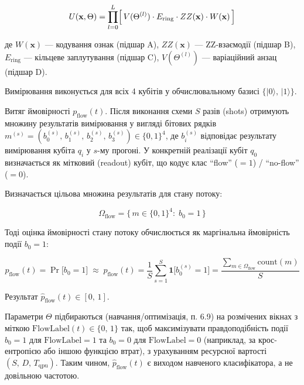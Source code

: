 \documentclass[12pt,a4paper]{article}
\begin{document}
\[U(\mathbf{x}, \Theta) = \prod_{l=0}^{L} \Bigl[\,V(\Theta^{(l)}) \cdot E_{\text{ring}} \cdot ZZ(\mathbf{x}) \cdot W(\mathbf{x})\,\Bigr]\]



де \(W(\mathbf{x})\) --- кодування ознак (підшар A), \(ZZ(\mathbf{x})\) --- ZZ-взаємодії (підшар B), \(E_{\text{ring}}\) --- кільцеве заплутування (підшар C), \(V(\Theta^{(l)})\) --- варіаційний анзац (підшар D).



Вимірювання виконується для всіх 4 кубітів у обчислювальному базисі \(\{|0\rangle,\,|1\rangle\}\).



Витяг ймовірності \(p_{\text{flow}}(t)\). Після виконання схеми \(S\) разів (shots) отримують множину результатів вимірювання у вигляді бітових рядків \(m^{(s)} = (b_0^{(s)},\,b_1^{(s)},\,b_2^{(s)},\,b_3^{(s)}) \in \{0,1\}^4\), де \(b_i^{(s)}\) відповідає результату вимірювання кубіта \(q_i\) у \(s\)-му прогоні. У конкретній реалізації кубіт \(q_0\) визначається як мітковий (readout) кубіт, що кодує клас ``flow'' (\(= 1\)) / ``no-flow'' (\(= 0\)).



Визначається цільова множина результатів для стану потоку:



\[\Omega_{\text{flow}} = \bigl\{\,m \in \{0,1\}^4 :\; b_0 = 1\,\bigr\}\]



Тоді оцінка ймовірності стану потоку обчислюється як маргінальна ймовірність події \(b_0 = 1\):



\[p_{\text{flow}}(t) = \Pr\bigl[b_0 = 1\bigr] \;\approx\; \hat{p}_{\text{flow}}(t) = \frac{1}{S}\sum_{s=1}^{S}\mathbf{1}\bigl[b_0^{(s)} = 1\bigr] = \frac{\displaystyle\sum_{m \in \Omega_{\text{flow}}} \text{count}(m)}{S}\]



Результат \(\hat{p}_{\text{flow}}(t) \in [0,\,1]\).



Параметри \(\Theta\) підбираються (навчання/оптимізація, п. 6.9) на розмічених вікнах з міткою \(\text{FlowLabel}(t) \in \{0,\,1\}\) так, щоб максимізувати правдоподібність події \(b_0 = 1\) для \(\text{FlowLabel} = 1\) та \(b_0 = 0\) для \(\text{FlowLabel} = 0\) (наприклад, за крос-ентропією або іншою функцією втрат), з урахуванням ресурсної вартості \((S,\,D,\,T_{\text{qpu}})\). Таким чином, \(\hat{p}_{\text{flow}}(t)\) є виходом навченого класифікатора, а не довільною частотою.
\end{document}
